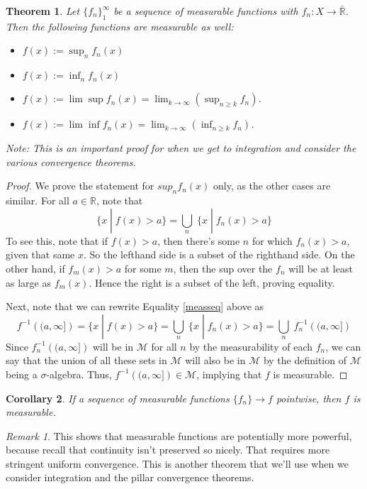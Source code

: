 \documentclass[12pt]{article}
\theoremstyle{plain}
\newtheorem{thm}{Theorem}[subsection]
\newtheorem{cor}[thm]{Corollary}
\theoremstyle{definition}
\theoremstyle{remark}
\newtheorem*{rmk}{Remark}
\begin{document}
\begin{thm}
Let $\{f_n\}^\infty_1$ be a sequence of measurable functions with $f_n: X\rightarrow\bar{\mathbb{R}}$. Then the following functions are measurable as well:
\begin{itemize}
    \item $f(x) := \sup_n f_n(x)$
    \item $f(x) := \inf_n f_n(x)$
    \item $f(x) := \lim \sup f_n(x) = \lim_{k\rightarrow\infty} \left(\sup_{n\geq k} f_n\right)$.
    \item $f(x) := \lim \inf f_n(x) = \lim_{k\rightarrow\infty} \left(\inf_{n\geq k} f_n\right)$.
\end{itemize}
\emph{\emph{Note:} This is an important proof for when we get to integration and consider the various convergence theorems.}
\end{thm}
\begin{proof}
We prove the statement for $sup_n f_n(x)$ only, as the other cases are similar. For all $a\in\mathbb{R}$, note that 
\begin{equation}
    \label{measseq}
    \{x \; | \; f(x) > a \} = \bigcup_n \; \{x \; | \; f_n(x)>a\}
\end{equation}
To see this, note that if $f(x)>a$, then there's some $n$ for which $f_n(x)>a$, given that same $x$. So the lefthand side is a subset of the righthand side. On the other hand, if $f_m(x)>a$ for some $m$, then the sup over the $f_n$ will be at least as large as $f_m(x)$. Hence the right is a subset of the left, proving equality.

Next, note that we can rewrite Equality \ref{measseq} above as 
\[ 
    f^{-1}\left((a,\infty]\right) = 
    \{x \; | \; f(x) > a \} = \bigcup_n \; \{x \; | \; f_n(x)>a\}
    = \bigcup_n \; f_n^{-1}\left((a,\infty]\right) 
\]
Since $f_n^{-1}\left((a,\infty]\right)$ will be in $\mathscr{M}$ for all $n$ by the measurability of each $f_n$, we can say that the union of all these sets in $\mathscr{M}$ will also be in $\mathscr{M}$ by the definition of $\mathscr{M}$ being a $\sigma$-algebra. Thus, $f^{-1}\left( (a, \infty]\right) \in\mathscr{M}$, implying that $f$ is measurable.
\end{proof}

\begin{cor}
\label{convmeas}
If a sequence of measurable functions $\{f_n\}\rightarrow f$ pointwise, then $f$ is measurable. 
\end{cor}

\begin{rmk}
This shows that measurable functions are potentially more powerful, because recall that continuity isn't preserved so nicely. That requires more stringent uniform convergence. This is another theorem that we'll use when we consider integration and the pillar convergence theorems.
\end{rmk}
\end{document}
